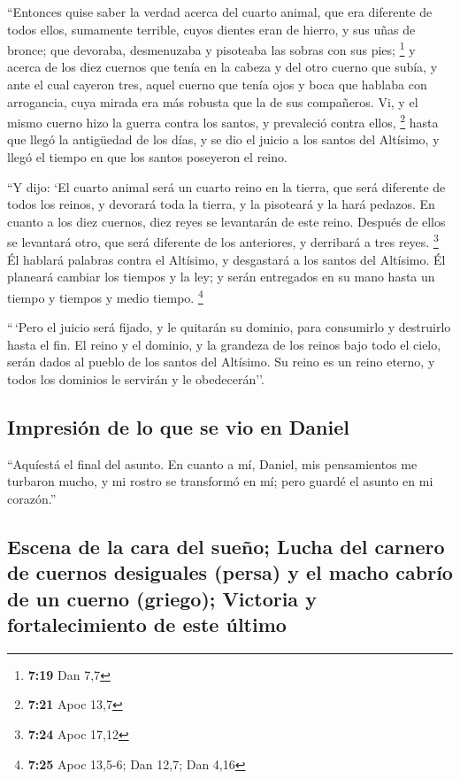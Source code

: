  ``Entonces quise saber la verdad acerca del cuarto
animal, que era diferente de todos ellos, sumamente terrible, cuyos
dientes eran de hierro, y sus uñas de bronce; que devoraba, desmenuzaba
y pisoteaba las sobras con sus pies; \footnote{\textbf{7:19} Dan 7,7}
 y acerca de los diez cuernos que tenía en la cabeza y
del otro cuerno que subía, y ante el cual cayeron tres, aquel cuerno que
tenía ojos y boca que hablaba con arrogancia, cuya mirada era más
robusta que la de sus compañeros.  Vi, y el mismo cuerno
hizo la guerra contra los santos, y prevaleció contra ellos, \footnote{\textbf{7:21}
  Apoc 13,7}  hasta que llegó la antigüedad de los días,
y se dio el juicio a los santos del Altísimo, y llegó el tiempo en que
los santos poseyeron el reino.

 ``Y dijo: `El cuarto animal será un cuarto reino en la
tierra, que será diferente de todos los reinos, y devorará toda la
tierra, y la pisoteará y la hará pedazos.  En cuanto a
los diez cuernos, diez reyes se levantarán de este reino. Después de
ellos se levantará otro, que será diferente de los anteriores, y
derribará a tres reyes. \footnote{\textbf{7:24} Apoc 17,12}
 Él hablará palabras contra el Altísimo, y desgastará a
los santos del Altísimo. Él planeará cambiar los tiempos y la ley; y
serán entregados en su mano hasta un tiempo y tiempos y medio tiempo.
\footnote{\textbf{7:25} Apoc 13,5-6; Dan 12,7; Dan 4,16}

 ``\,`Pero el juicio será fijado, y le quitarán su
dominio, para consumirlo y destruirlo hasta el fin.  El
reino y el dominio, y la grandeza de los reinos bajo todo el cielo,
serán dados al pueblo de los santos del Altísimo. Su reino es un reino
eterno, y todos los dominios le servirán y le obedecerán''.

\hypertarget{impresiuxf3n-de-lo-que-se-vio-en-daniel}{%
\subsection{Impresión de lo que se vio en
Daniel}\label{impresiuxf3n-de-lo-que-se-vio-en-daniel}}

 ``Aquíestá el final del asunto. En cuanto a mí, Daniel,
mis pensamientos me turbaron mucho, y mi rostro se transformó en mí;
pero guardé el asunto en mi corazón.''

\hypertarget{escena-de-la-cara-del-sueuxf1o-lucha-del-carnero-de-cuernos-desiguales-persa-y-el-macho-cabruxedo-de-un-cuerno-griego-victoria-y-fortalecimiento-de-este-uxfaltimo}{%
\subsection{Escena de la cara del sueño; Lucha del carnero de cuernos
desiguales (persa) y el macho cabrío de un cuerno (griego); Victoria y
fortalecimiento de este
último}\label{escena-de-la-cara-del-sueuxf1o-lucha-del-carnero-de-cuernos-desiguales-persa-y-el-macho-cabruxedo-de-un-cuerno-griego-victoria-y-fortalecimiento-de-este-uxfaltimo}}

